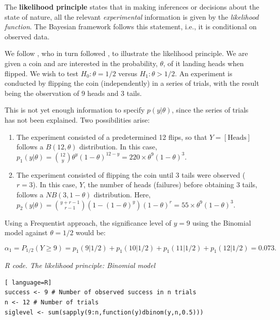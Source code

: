 The \textbf{likelihood principle} states that in making inferences or decisions about the state of nature, all the relevant \textit{experimental} information is given by the \textit{likelihood function}. The Bayesian framework follows this statement, i.e., it is conditional on observed data.

We follow \cite{berger93}, who in turn followed \cite{Lindley76}, to illustrate the likelihood principle. We are given a coin and are interested in the probability, $\theta$, of it landing heads when flipped. We wish to test $H_0: \theta = 1/2$ versus $H_1: \theta > 1/2$. An experiment is conducted by flipping the coin (independently) in a series of trials, with the result being the observation of 9 heads and 3 tails.

This is not yet enough information to specify $p(y|\theta)$, since the series of trials has not been explained. Two possibilities arise:

\begin{enumerate}
	\item The experiment consisted of a predetermined 12 flips, so that $Y = \left[ \text{Heads} \right]$ follows a ${B}(12, \theta)$ distribution. In this case, $p_1(y|\theta) = \binom{12}{y} \theta^y (1 - \theta)^{12 - y} = 220 \times \theta^9 (1 - \theta)^3$.
	\item The experiment consisted of flipping the coin until 3 tails were observed ($r = 3$). In this case, $Y$, the number of heads (failures) before obtaining 3 tails, follows a ${NB}(3, 1 - \theta)$ distribution. Here, $p_2(y|\theta) = \binom{y + r - 1}{r - 1} (1 - (1 - \theta)^y)(1 - \theta)^r = 55 \times \theta^9 (1 - \theta)^3$.
\end{enumerate}

Using a Frequentist approach, the significance level of $y=9$ using the Binomial model against $\theta=1/2$ would be:

\begin{equation*}
	\alpha_1=P_{1/2}(Y\geq
	9)=p_1(9|1/2)+p_1(10|1/2)+p_1(11|1/2)+p_1(12|1/2)=0.073.
\end{equation*}

\begin{tcolorbox}[enhanced,width=4.67in,center upper,
	fontupper=\large\bfseries,drop shadow southwest,sharp corners]
	\textit{R code. The likelihood principle: Binomial model}
\begin{VF}
\begin{lstlisting}[ language=R]
success <- 9 # Number of observed success in n trials
n <- 12 # Number of trials
siglevel <- sum(sapply(9:n,function(y)dbinom(y,n,0.5)))
\end{lstlisting}
\end{VF}
\end{tcolorbox}

